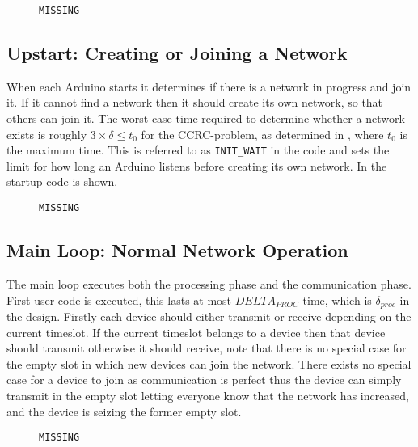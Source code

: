 \begin{figure}
\begin{lstlisting}[style=customc,caption={The variables and functions used to implement timing.},label={lst:ccrc:timing}]
MISSING
\end{lstlisting}
\vspace{-20pt}
\end{figure}

\subsection{Upstart: Creating or Joining a Network}
When each Arduino starts it determines if there is a network in progress and join it. 
If it cannot find a network then it should create its own network, so that others can join it. 
The worst case time required to determine whether a network exists is roughly $3 \times \delta \leq t_0$ for the CCRC-problem, as determined in , where $t_0$ is the maximum time. 
This is referred to as \texttt{INIT\_WAIT} in the code and sets the limit for how long an Arduino listens before creating its own network. 
In  the startup code is shown. 
\begin{figure}
\begin{lstlisting}[style=customc,caption={Startup, if a network is found join it, if not create one.},label={lst:ccrc:startup}]
MISSING
\end{lstlisting}
\end{figure}
\subsection{Main Loop: Normal Network Operation}
The main loop executes both the processing phase and the communication phase.
First user-code is executed, this lasts at most \texttt{$DELTA_{PROC}$} time, which is $\delta_{proc}$ in the design. 
Firstly each device should either transmit or receive depending on the current timeslot. 
If the current timeslot belongs to a device then that device should transmit otherwise it should receive, note that there is no special case for the empty slot in which new devices can join the network.
There exists no special case for a device to join as communication is perfect thus the device can simply transmit in the empty slot letting everyone know that the network has increased, and the device is seizing the former empty slot.
\begin{figure}
\begin{lstlisting}[style=customc,caption={Important parts of the main loop.},label={lst:ccrc:rxortx}]
MISSING
\end{lstlisting}
\end{figure}

